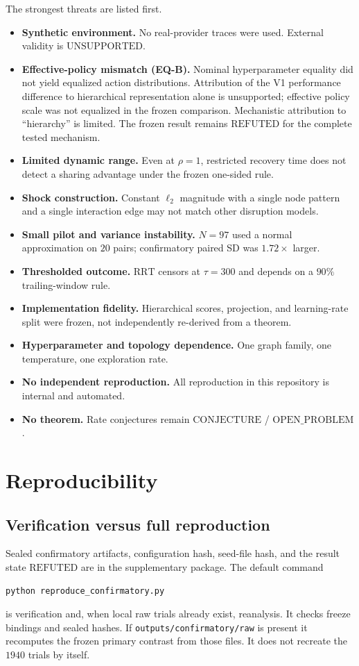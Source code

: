 \documentclass{article}
\newcommand{\rrt}{\mathrm{RRT}}
\begin{document}
The strongest threats are listed first.
\begin{itemize}
\item \textbf{Synthetic environment.} No real-provider traces were used. External validity is $\mathrm{UNSUPPORTED}$.
\item \textbf{Effective-policy mismatch (EQ-B).} Nominal hyperparameter equality did not yield equalized action distributions. Attribution of the V1 performance difference to hierarchical representation alone is unsupported; effective policy scale was not equalized in the frozen comparison. Mechanistic attribution to ``hierarchy'' is limited. The frozen result remains $\mathrm{REFUTED}$ for the complete tested mechanism.
\item \textbf{Limited dynamic range.} Even at $\rho=1$, restricted recovery time does not detect a sharing advantage under the frozen one-sided rule.
\item \textbf{Shock construction.} Constant $\ell_2$ magnitude with a single node pattern and a single interaction edge may not match other disruption models.
\item \textbf{Small pilot and variance instability.} $N=97$ used a normal approximation on $20$ pairs; confirmatory paired SD was $1.72\times$ larger.
\item \textbf{Thresholded outcome.} $\rrt$ censors at $\tau=300$ and depends on a $90\%$ trailing-window rule.
\item \textbf{Implementation fidelity.} Hierarchical scores, projection, and learning-rate split were frozen, not independently re-derived from a theorem.
\item \textbf{Hyperparameter and topology dependence.} One graph family, one temperature, one exploration rate.
\item \textbf{No independent reproduction.} All reproduction in this repository is internal and automated.
\item \textbf{No theorem.} Rate conjectures remain $\mathrm{CONJECTURE}$ / $\mathrm{OPEN\_PROBLEM}$.
\end{itemize}

\section{Reproducibility}

\subsection{Verification versus full reproduction}
Sealed confirmatory artifacts, configuration hash, seed-file hash, and the result state $\mathrm{REFUTED}$ are in the supplementary package.
The default command
\begin{verbatim}
python reproduce_confirmatory.py
\end{verbatim}
is verification and, when local raw trials already exist, reanalysis.
It checks freeze bindings and sealed hashes.
If \texttt{outputs/confirmatory/raw} is present it recomputes the frozen primary contrast from those files.
It does not recreate the $1940$ trials by itself.
\end{document}
